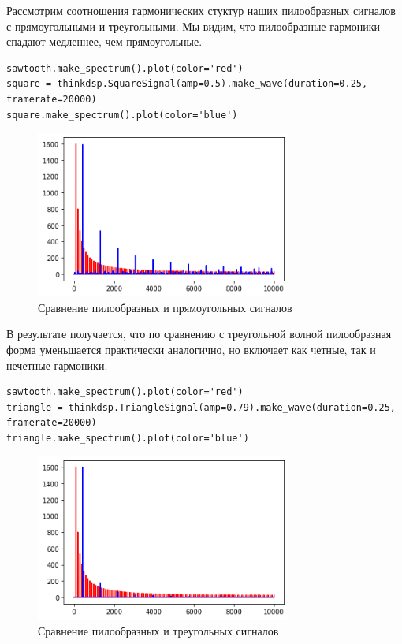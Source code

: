 \documentclass[a4paper,12pt]{report}
\begin{document}
Рассмотрим соотношения гармонических стуктур наших пилообразных сигналов с прямоугольными и треугольными. Мы видим, что пилообразные гармоники спадают медленнее, чем прямоугольные.

\begin{lstlisting}[caption=Сравнение пилообразных и прямоугольных сигналов]
sawtooth.make_spectrum().plot(color='red')
square = thinkdsp.SquareSignal(amp=0.5).make_wave(duration=0.25, framerate=20000)
square.make_spectrum().plot(color='blue')
\end{lstlisting}

\begin{figure}[H]
        \centering
        \includegraphics[width=0.75\textwidth]{lab2_fig2_3.png}
        \caption{Сравнение пилообразных и прямоугольных сигналов}
        \label{fig:lab2_fig2_3}
\end{figure}

В результате получается, что по сравнению с треугольной волной пилообразная форма уменьшается практически аналогично, но включает как четные, так и нечетные гармоники.

\begin{lstlisting}[caption=Сравнение пилообразных и треугольных сигналов]
sawtooth.make_spectrum().plot(color='red')
triangle = thinkdsp.TriangleSignal(amp=0.79).make_wave(duration=0.25, framerate=20000)
triangle.make_spectrum().plot(color='blue')
\end{lstlisting}

\begin{figure}[H]
        \centering
        \includegraphics[width=0.75\textwidth]{lab2_fig2_4.png}
        \caption{Сравнение пилообразных и треугольных сигналов}
        \label{fig:lab2_fig2_4}
\end{figure}
\end{document}
